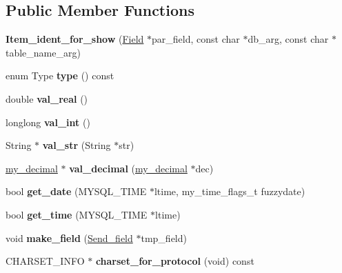 \subsection*{Public Member Functions}
\begin{DoxyCompactItemize}
\item 
\mbox{\label{classItem__ident__for__show_a2d9eb07836f5644989ebfeae36e6f8c8}} 
{\bfseries Item\+\_\+ident\+\_\+for\+\_\+show} (\mbox{\hyperlink{classField}{Field}} $\ast$par\+\_\+field, const char $\ast$db\+\_\+arg, const char $\ast$table\+\_\+name\+\_\+arg)
\item 
\mbox{\label{classItem__ident__for__show_a8d6618893f224c25a7b8c880fd4b7c7f}} 
enum Type {\bfseries type} () const
\item 
\mbox{\label{classItem__ident__for__show_a0162478f52389b01af7573130c4fed98}} 
double {\bfseries val\+\_\+real} ()
\item 
\mbox{\label{classItem__ident__for__show_afc69f29269a5e64376de096b640421f1}} 
longlong {\bfseries val\+\_\+int} ()
\item 
\mbox{\label{classItem__ident__for__show_a0022f9cf16dd8165a049f9cddfe74235}} 
String $\ast$ {\bfseries val\+\_\+str} (String $\ast$str)
\item 
\mbox{\label{classItem__ident__for__show_af187d03c57cde5e73f138b3c2cd72676}} 
\mbox{\hyperlink{classmy__decimal}{my\+\_\+decimal}} $\ast$ {\bfseries val\+\_\+decimal} (\mbox{\hyperlink{classmy__decimal}{my\+\_\+decimal}} $\ast$dec)
\item 
\mbox{\label{classItem__ident__for__show_a60d747a4c82ac1433bd71d25b2fad3ab}} 
bool {\bfseries get\+\_\+date} (M\+Y\+S\+Q\+L\+\_\+\+T\+I\+ME $\ast$ltime, my\+\_\+time\+\_\+flags\+\_\+t fuzzydate)
\item 
\mbox{\label{classItem__ident__for__show_ad7051bb84ccc506847e980ff222cf6e4}} 
bool {\bfseries get\+\_\+time} (M\+Y\+S\+Q\+L\+\_\+\+T\+I\+ME $\ast$ltime)
\item 
\mbox{\label{classItem__ident__for__show_a9558571e2264948a70fc73d103cb7094}} 
void {\bfseries make\+\_\+field} (\mbox{\hyperlink{classSend__field}{Send\+\_\+field}} $\ast$tmp\+\_\+field)
\item 
\mbox{\label{classItem__ident__for__show_a47026ea4b2bf4cb0a7aa77731723848d}} 
C\+H\+A\+R\+S\+E\+T\+\_\+\+I\+N\+FO $\ast$ {\bfseries charset\+\_\+for\+\_\+protocol} (void) const
\end{DoxyCompactItemize}
